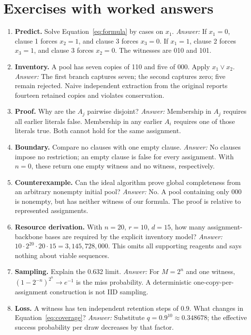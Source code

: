 \section{Exercises with worked answers}
\begin{enumerate}
\item \textbf{Predict.} Solve Equation~\ref{eq:formula} by cases on $x_1$.
\textit{Answer:} If $x_1=0$, clause 1 forces $x_2=1$, and clause 3 forces
$x_3=0$. If $x_1=1$, clause 2 forces $x_3=1$, and clause 3 forces $x_2=0$.
The witnesses are 010 and 101.
\item \textbf{Inventory.} A pool has seven copies of 110 and five of 000.
Apply $x_1\lor x_2$. \textit{Answer:} The first branch captures seven;
the second captures zero; five remain rejected. Naive independent extraction
from the original reports fourteen retained copies and violates conservation.
\item \textbf{Proof.} Why are the $A_j$ pairwise disjoint?
\textit{Answer:} Membership in $A_j$ requires all earlier literals false.
Membership in any earlier $A_i$ requires one of those literals true.
Both cannot hold for the same assignment.
\item \textbf{Boundary.} Compare no clauses with one empty clause.
\textit{Answer:} No clauses impose no restriction; an empty clause is false
for every assignment. With $n=0$, these return one empty witness and no
witness, respectively.
\item \textbf{Counterexample.} Can the ideal algorithm prove global
completeness from an arbitrary nonempty initial pool?
\textit{Answer:} No. A pool containing only 000 is nonempty, but has neither
witness of our formula. The proof is relative to represented assignments.
\item \textbf{Resource derivation.} With $n=20$, $r=10$, $d=15$, how many
assignment-backbone bases are required by the explicit inventory model?
\textit{Answer:} $10\cdot2^{20}\cdot20\cdot15=3{,}145{,}728{,}000$.
This omits all supporting reagents and says nothing about viable sequences.
\item \textbf{Sampling.} Explain the 0.632 limit.
\textit{Answer:} For $M=2^n$ and one witness,
$(1-2^{-n})^{2^n}\to e^{-1}$ is the miss probability.
A deterministic one-copy-per-assignment construction is not IID sampling.
\item \textbf{Loss.} A witness has ten independent retention steps of 0.9.
What changes in Equation~\ref{eq:coverage}?
\textit{Answer:} Substitute $q=0.9^{10}\approx0.348678$;
the effective success probability per draw decreases by that factor.

\end{enumerate}
